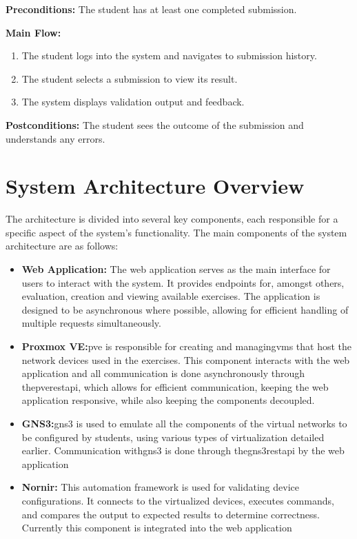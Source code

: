         \textbf{Preconditions:} The student has at least one completed submission.

        \textbf{Main Flow:}
        \begin{enumerate}
            \item The student logs into the system and navigates to submission history.
            \item The student selects a submission to view its result.
            \item The system displays validation output and feedback.
        \end{enumerate}

        \textbf{Postconditions:} The student sees the outcome of the submission and understands any errors.


\section{System Architecture Overview}
    The architecture is divided into several key components, each responsible for a specific aspect of the system's functionality. 
    The main components of the system architecture are as follows:

    \begin{itemize}
        \item \textbf{Web Application:} The web application serves as the main interface for users to interact with the system. It provides 
        endpoints for, amongst others, evaluation, creation  and viewing available exercises. The application is designed to be asynchronous 
        where possible, allowing for efficient handling of multiple requests simultaneously.
        
        \item \textbf{Proxmox VE:}\ac{pve} is responsible for creating and managing\ac{vm}s that host the network devices used in 
        the exercises. This component interacts with the web application and all communication is done asynchronously through 
        the\ac{pve}\ac{rest}\ac{api}, which allows for efficient communication, keeping the web application responsive, while also 
        keeping the components decoupled.
        
        \item \textbf{GNS3:}\ac{gns3} is used to emulate all the components of the virtual networks to be configured by students, 
        using various types of virtualization detailed earlier. Communication with\ac{gns3} is done through 
        the\ac{gns3}\ac{rest}\ac{api} by the web application

        \item \textbf{Nornir:} This automation framework is used for validating device configurations. It connects to the 
        virtualized devices, executes commands, and compares the output to expected results to determine correctness.
        Currently this component is integrated into the web application
    \end{itemize}


